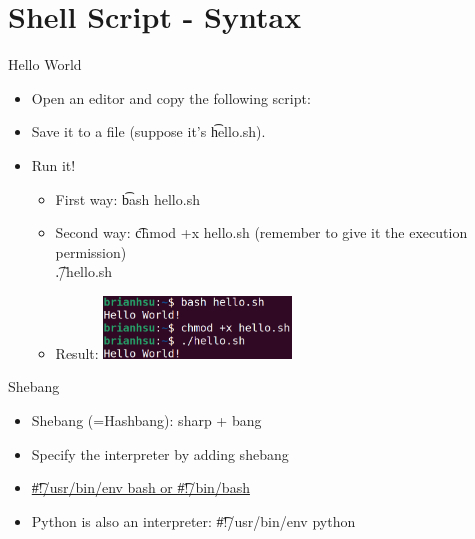 \section{Shell Script - Syntax}

\begin{frame}[fragile]{Hello World}
\begin{multicols}{2}
\begin{itemize}
\item Open an editor and copy the following script:\\

\item Save it to a file (suppose it's \t{hello.sh}).
\newpage
\item Run it!
\begin{itemize}
\item First way: \t{bash hello.sh}
\item Second way: \t{chmod +x hello.sh} (remember to give it the execution permission)\\
\t{./hello.sh}
\item Result: \includegraphics[width=5cm]{helloworld.png}
\end{itemize}
\end{itemize}
\end{multicols}
\end{frame}

\begin{frame}[fragile]{Shebang}
\begin{itemize}
\item Shebang (=Hashbang): sharp + bang
\item Specify the interpreter by adding shebang
\item \href{https://stackoverflow.com/questions/21612980/why-is-usr-bin-env-bash-superior-to-bin-bash}{\t{\#!/usr/bin/env bash} or \t{\#!/bin/bash}}
\item Python is also an interpreter: \t{\#!/usr/bin/env python}
\end{itemize}
\end{frame}

